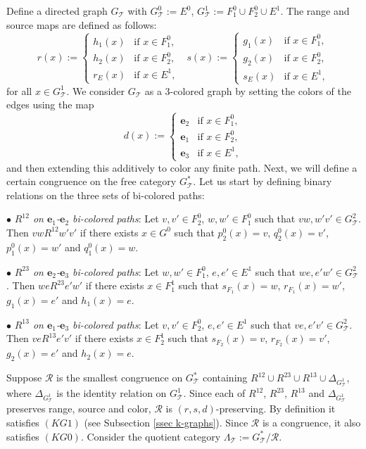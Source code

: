 \documentclass[a4paper,reqno,12pt]{amsart}
\newcommand{\ea}{\mathbf{e}_1}
\newcommand{\eb}{\mathbf{e}_2}
\newcommand{\ec}{\mathbf{e}_3}
\theoremstyle{definition}
\theoremstyle{remark}
\begin{document}
Define a directed graph $G_{\mathcal{T}}$ with $G_{\mathcal{T}}^0:=E^0$, $G_{\mathcal{T}}^1:=F_1^0\cup F_2^0\cup E^1$. The range and source maps are defined as follows:
\[r(x):=
	\left\{
	\begin{array}{lll}
		h_1(x)  & \mbox{if } x\in F_1^0, \\
		h_2(x) & \mbox{if }  x\in F_2^0,\\
        r_E(x) & \mbox{if }  x\in E^1,
	\end{array}
	\right.~~~
s(x):=
	\left\{
	\begin{array}{lll}
		g_1(x)  & \mbox{if } x\in F_1^0, \\
		g_2(x) & \mbox{if }  x\in F_2^0,\\
        s_E(x) & \mbox{if }  x\in E^1,
	\end{array}
	\right. 
\]
for all $x\in G_{\mathcal{T}}^1$. We consider $G_{\mathcal{T}}$ as a $3$-colored graph by setting the colors of the edges using the map
\[
d(x):=
	\left\{
	\begin{array}{lll}
		\eb  & \mbox{if } x\in F_1^0, \\
		\ea & \mbox{if }  x\in F_2^0,\\
        \ec & \mbox{if }  x\in E^1,
	\end{array}
	\right. 
\] and then extending this additively to color any finite path. Next, we will define a certain congruence on the free category $G_{\mathcal{T}}^*$. Let us start by defining binary relations on the three sets of bi-colored paths:

$\bullet$ \emph{$R^{12}$ on $\ea$-$\eb$ bi-colored paths}: Let $v,v'\in F_2^0$, $w,w'\in F_1^0$ such that $vw,w'v'\in G_{\mathcal{T}}^2$. Then $vw R^{12} w'v'$ if there exists $x\in G^0$ such that $p_2^0(x)=v$, $q_2^0(x)=v'$, $p_1^0(x)=w'$ and $q_1^0(x)=w$.

$\bullet$ \emph{$R^{23}$ on $\eb$-$\ec$ bi-colored paths}: Let $w,w'\in F_1^0$, $e,e'\in E^1$ such that $we,e'w'\in G_{\mathcal{T}}^2$. Then $we R^{23} e'w'$ if there exists $x\in F_1^1$ such that $s_{F_1}(x)=w$, $r_{F_1}(x)=w'$, $g_1(x)=e'$ and $h_1(x)=e$.

$\bullet$ \emph{$R^{13}$ on $\ea$-$\ec$ bi-colored paths}: Let $v,v'\in F_2^0$, $e,e'\in E^1$ such that $ve,e'v'\in G_{\mathcal{T}}^2$. Then $ve R^{13} e'v'$ if there exists $x\in F_2^1$ such that $s_{F_2}(x)=v$, $r_{F_2}(x)=v'$, $g_2(x)=e'$ and $h_2(x)=e$.

Suppose $\mathcal{R}$ is the smallest congruence on $G_{\mathcal{T}}^*$ containing $R^{12}\cup R^{23}\cup R^{13}\cup \Delta_{G_{\mathcal{T}}^1}$, where $\Delta_{G_{\mathcal{T}}^1}$ is the identity relation on $G_{\mathcal{T}}^1$. Since each of $R^{12}$, $R^{23}$, $R^{13}$ and $\Delta_{G_{\mathcal{T}}^1}$ preserves range, source and color, $\mathcal{R}$ is $(r,s,d)$-preserving. By definition it satisfies $(KG1)$ (see Subsection \ref{ssec k-graphs}). Since $\mathcal{R}$ is a congruence, it also satisfies $(KG0)$. Consider the quotient category $\Lambda_{\mathcal{T}}:=G_{\mathcal{T}}^*/\mathcal{R}$. 
\end{document}
